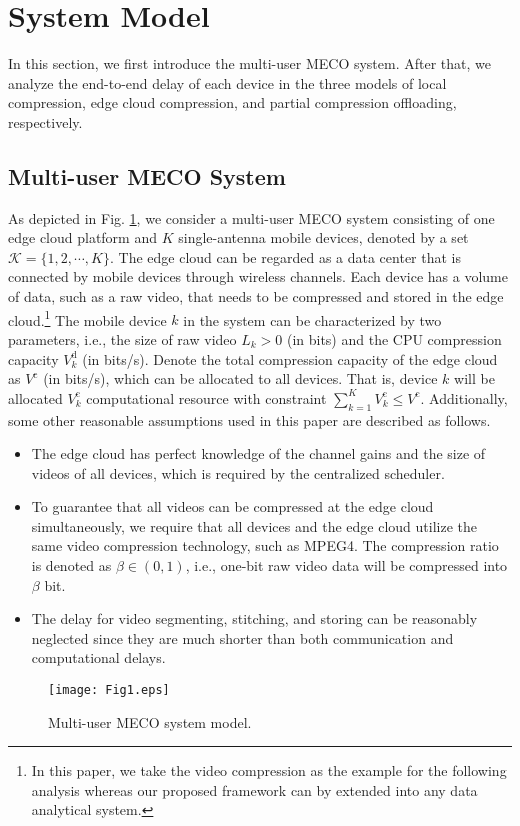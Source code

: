 \documentclass[journal,draftcls,onecolumn,12pt,twoside]{IEEEtran}
\begin{document}
\section{System Model}
In this section, we first introduce the multi-user MECO system. After that, we analyze the end-to-end delay of each device in the three models of local compression, edge cloud compression, and partial compression offloading, respectively.

\subsection{Multi-user MECO System}
As depicted in Fig. \ref{System model}, we consider a multi-user MECO system consisting of one edge cloud platform and $K$ single-antenna mobile devices, denoted by a set $\mathcal{K}=\{1, 2, \cdots, K \}$. The edge cloud can be regarded as a data center that is connected by mobile devices through wireless channels. Each device has a volume of data, such as a raw video, that needs to be compressed and stored in the edge cloud.\footnote{In this paper, we take the video compression as the example for the following analysis whereas our proposed framework can by extended into any data analytical system.} The mobile device $k$ in the system can be characterized by two parameters, i.e., the size of raw video $L_k>0$ (in bits) and the CPU compression capacity $V_k^{\text{d}}$ (in bits/s). Denote the total compression capacity of the edge cloud as $V^{\text{c}}$ (in bits/s), which can be allocated to all devices. That is, device $k$ will be allocated $V_k^{\text{c}}$ computational resource with constraint $\sum_{k=1}^{K} V_k^{\text{c}} \le V^{\text{c}}$.  Additionally, some other reasonable assumptions used in this paper are described as follows.
\begin{itemize}
    \item The edge cloud has perfect knowledge of the channel gains and the size of videos of all devices, which is required by the centralized scheduler.
	\item To guarantee that all videos can be compressed at the edge cloud simultaneously, we require that all devices and the edge cloud utilize the same video compression technology, such as MPEG4.
          The compression ratio is denoted as $\beta\in\left(0,1\right)$, i.e., one-bit raw video data will be compressed into $\beta$ bit.
	\item The delay for video segmenting, stitching, and storing can be reasonably neglected since they are much shorter than both communication and computational delays.
\end{itemize}
\begin{figure}[!htp]
	\centering
	\texttt{[image: Fig1.eps]}
	\caption{Multi-user MECO system model.}	
	\label{System model}
\end{figure}
\end{document}
